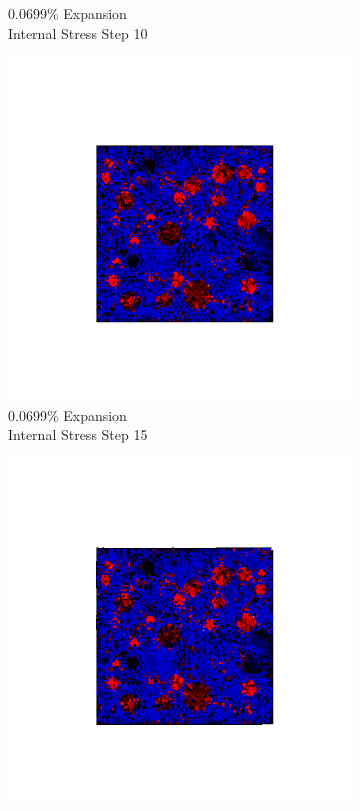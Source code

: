 \begin{figure}[ht!]
\begin{subfigure}{.25\textwidth}
      \caption{0.0699\% Expansion\\Internal Stress Step 10}
    \end{subfigure}%
    \begin{subfigure}{.25\textwidth}
      \centering
      \includegraphics[width=1.0\linewidth]{Files/exp_3D/ASR/A15P75_1_s15.png}
      \caption{0.0699\% Expansion\\Internal Stress Step 15}
    \end{subfigure}%
    \begin{subfigure}{.25\textwidth}
      \centering
      \includegraphics[width=1.0\linewidth]{Files/exp_3D/ASR/A15P75_1_stress.png}

\end{subfigure}
\end{figure}
